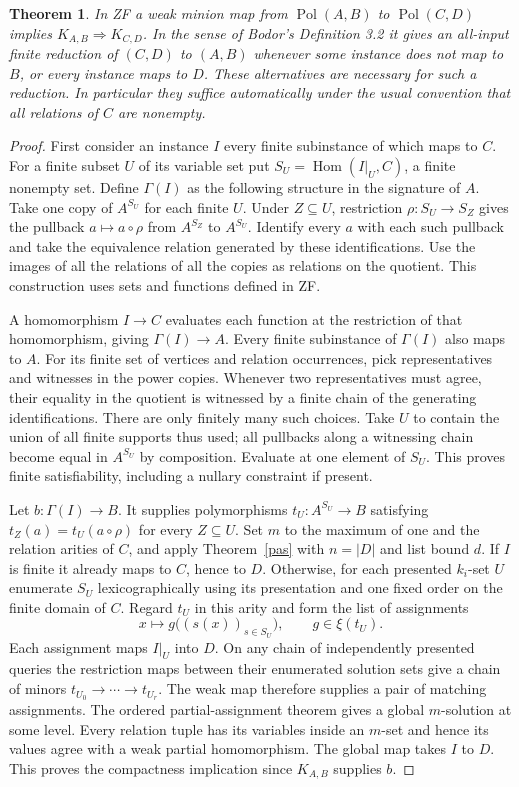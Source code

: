 \documentclass[11pt]{article}
\newtheorem{theorem}{Theorem}
\newcommand{\Pol}{\operatorname{Pol}}
\newcommand{\Hom}{\operatorname{Hom}}
\begin{document}
\begin{theorem}\label{reduction}
In ZF a weak minion map from $\Pol(A,B)$ to $\Pol(C,D)$ implies $K_{A,B}\Rightarrow K_{C,D}$. In the sense of Bodor's Definition 3.2 it gives an all-input finite reduction of $(C,D)$ to $(A,B)$ whenever some instance does not map to $B$, or every instance maps to $D$. These alternatives are necessary for such a reduction. In particular they suffice automatically under the usual convention that all relations of $C$ are nonempty.
\end{theorem}
\begin{proof}
First consider an instance $I$ every finite subinstance of which maps to $C$. For a finite subset $U$ of its variable set put $S_U=\Hom(I|_U,C)$, a finite nonempty set. Define $\Gamma(I)$ as the following structure in the signature of $A$. Take one copy of $A^{S_U}$ for each finite $U$. Under $Z\subseteq U$, restriction $\rho:S_U\to S_Z$ gives the pullback $a\mapsto a\circ\rho$ from $A^{S_Z}$ to $A^{S_U}$. Identify every $a$ with each such pullback and take the equivalence relation generated by these identifications. Use the images of all the relations of all the copies as relations on the quotient. This construction uses sets and functions defined in ZF.

A homomorphism $I\to C$ evaluates each function at the restriction of that homomorphism, giving $\Gamma(I)\to A$. Every finite subinstance of $\Gamma(I)$ also maps to $A$. For its finite set of vertices and relation occurrences, pick representatives and witnesses in the power copies. Whenever two representatives must agree, their equality in the quotient is witnessed by a finite chain of the generating identifications. There are only finitely many such choices. Take $U$ to contain the union of all finite supports thus used; all pullbacks along a witnessing chain become equal in $A^{S_U}$ by composition. Evaluate at one element of $S_U$. This proves finite satisfiability, including a nullary constraint if present.

Let $b:\Gamma(I)\to B$. It supplies polymorphisms $t_U:A^{S_U}\to B$ satisfying $t_Z(a)=t_U(a\circ\rho)$ for every $Z\subseteq U$. Set $m$ to the maximum of one and the relation arities of $C$, and apply Theorem~\ref{pas} with $n=|D|$ and list bound $d$. If $I$ is finite it already maps to $C$, hence to $D$. Otherwise, for each presented $k_i$-set $U$ enumerate $S_U$ lexicographically using its presentation and one fixed order on the finite domain of $C$. Regard $t_U$ in this arity and form the list of assignments
\[
      x\longmapsto g\big((s(x))_{s\in S_U}\big),
                \qquad g\in \xi(t_U).
\]
Each assignment maps $I|_U$ into $D$. On any chain of independently presented queries the restriction maps between their enumerated solution sets give a chain of minors $t_{U_0}\to\cdots\to t_{U_r}$. The weak map therefore supplies a pair of matching assignments. The ordered partial-assignment theorem gives a global $m$-solution at some level. Every relation tuple has its variables inside an $m$-set and hence its values agree with a weak partial homomorphism. The global map takes $I$ to $D$. This proves the compactness implication since $K_{A,B}$ supplies $b$.


\end{proof}
\end{document}
